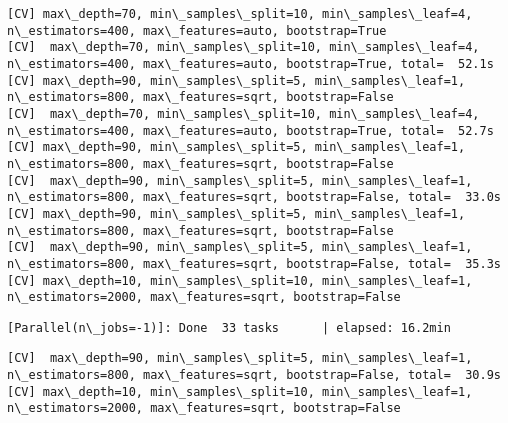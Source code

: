 \documentclass[11pt]{article}
\begin{document}
\begin{Verbatim}[commandchars=\\\{\}]
[CV] max\_depth=70, min\_samples\_split=10, min\_samples\_leaf=4, n\_estimators=400, max\_features=auto, bootstrap=True 
[CV]  max\_depth=70, min\_samples\_split=10, min\_samples\_leaf=4, n\_estimators=400, max\_features=auto, bootstrap=True, total=  52.1s
[CV] max\_depth=90, min\_samples\_split=5, min\_samples\_leaf=1, n\_estimators=800, max\_features=sqrt, bootstrap=False 
[CV]  max\_depth=70, min\_samples\_split=10, min\_samples\_leaf=4, n\_estimators=400, max\_features=auto, bootstrap=True, total=  52.7s
[CV] max\_depth=90, min\_samples\_split=5, min\_samples\_leaf=1, n\_estimators=800, max\_features=sqrt, bootstrap=False 
[CV]  max\_depth=90, min\_samples\_split=5, min\_samples\_leaf=1, n\_estimators=800, max\_features=sqrt, bootstrap=False, total=  33.0s
[CV] max\_depth=90, min\_samples\_split=5, min\_samples\_leaf=1, n\_estimators=800, max\_features=sqrt, bootstrap=False 
[CV]  max\_depth=90, min\_samples\_split=5, min\_samples\_leaf=1, n\_estimators=800, max\_features=sqrt, bootstrap=False, total=  35.3s
[CV] max\_depth=10, min\_samples\_split=10, min\_samples\_leaf=1, n\_estimators=2000, max\_features=sqrt, bootstrap=False 

    \end{Verbatim}

    \begin{Verbatim}[commandchars=\\\{\}]
[Parallel(n\_jobs=-1)]: Done  33 tasks      | elapsed: 16.2min

    \end{Verbatim}

    \begin{Verbatim}[commandchars=\\\{\}]
[CV]  max\_depth=90, min\_samples\_split=5, min\_samples\_leaf=1, n\_estimators=800, max\_features=sqrt, bootstrap=False, total=  30.9s
[CV] max\_depth=10, min\_samples\_split=10, min\_samples\_leaf=1, n\_estimators=2000, max\_features=sqrt, bootstrap=False 

    \end{Verbatim}
\end{document}
